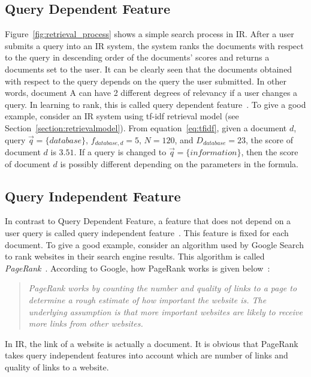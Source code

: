 \subsection{Query Dependent Feature}\label{section:querydependent}
Figure~\ref{fig:retrieval_process} shows a simple search process in IR. After a user submits a query into an IR system, the system ranks the documents 
with respect to the query in descending order of the documents' scores and returns a documents set to the user. It can be clearly seen that the documents obtained with respect to the query depends on the 
query the user submitted. In other words, document A can have 2 different degrees of relevancy if a user changes a query.
In learning to rank, this is called query dependent feature~\cite{craig}. To give a good example, consider an IR system using tf-idf retrieval model 
(see Section~\ref{section:retrievalmodel}). From equation~\ref{eq:tfidf}, given a document $d$, query $\vec{q} = \{database\}$, $f_{database,d} = 5$, $N = 120$, and 
$D_{database} = 23$, the score of document $d$ is $3.51$. If a query is changed to $\vec{q} = \{information\}$, then the score of document $d$ is possibly 
different depending on the parameters in the formula.


\subsection{Query Independent Feature}\label{section:queryindependent}
In contrast to Query Dependent Feature, a feature that does not depend on a user query is called query independent feature~\cite{craig}. This feature is fixed for each
document. To give a good example, consider an algorithm used by Google Search to rank websites in their search engine results. This algorithm is called
\textit{PageRank}~\cite{pagerank}. According to Google, how PageRank works is given below~\cite{pagerank}:

\begin{quotation}
\textit{
 PageRank works by counting the number and quality of links to a page to determine a rough estimate of how important the website is. 
 The underlying assumption is that more important websites are likely to receive more links from other websites.}
\end{quotation}

In IR, the link of a website is actually a document. It is obvious that PageRank takes query independent features into account which are number of 
links and quality of links to a website.

